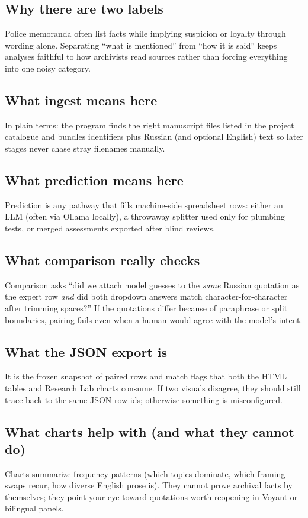 \documentclass[11pt,a4paper]{article}
\theoremstyle{remark}
\begin{document}
\subsection{Why there are two labels}
Police memoranda often list facts while implying suspicion or loyalty through wording alone. Separating ``what is mentioned'' from ``how it is said'' keeps analyses faithful to how archivists read sources rather than forcing everything into one noisy category.

\subsection{What ingest means here}
In plain terms: the program finds the right manuscript files listed in the project catalogue and bundles identifiers plus Russian (and optional English) text so later stages never chase stray filenames manually.

\subsection{What prediction means here}
Prediction is any pathway that fills machine-side spreadsheet rows: either an LLM (often via Ollama locally), a throwaway splitter used only for plumbing tests, or merged assessments exported after blind reviews.

\subsection{What comparison really checks}
Comparison asks ``did we attach model guesses to the \emph{same} Russian quotation as the expert row \emph{and} did both dropdown answers match character-for-character after trimming spaces?'' If the quotations differ because of paraphrase or split boundaries, pairing fails even when a human would agree with the model's intent.

\subsection{What the JSON export is}
It is the frozen snapshot of paired rows and match flags that both the HTML tables and Research Lab charts consume. If two visuals disagree, they should still trace back to the same JSON row ids; otherwise something is misconfigured.

\subsection{What charts help with (and what they cannot do)}
Charts summarize frequency patterns (which topics dominate, which framing swaps recur, how diverse English prose is). They cannot prove archival facts by themselves; they point your eye toward quotations worth reopening in Voyant or bilingual panels.
\end{document}

